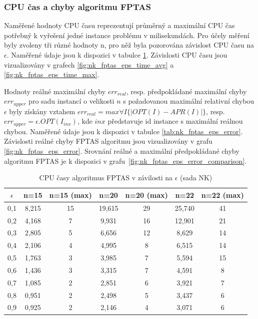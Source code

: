 \documentclass[12pt]{article}
\begin{document}
\subsubsection{CPU čas a chyby algoritmu FPTAS}

Naměřené hodnoty CPU času reprezentují průměrný a maximální CPU čas potřebný k vyřešení jedné instance problému v milisekundách. Pro účely měření byly zvoleny tři různé hodnoty n, pro něž byla pozorována závislost CPU času na $\epsilon$. Naměřené údaje jsou k dispozici v tabulce \ref{tab:nk_fptas_eps_times}. Závislosti CPU času jsou vizualizovány v grafech \ref{fig:nk_fptas_eps_time_avg} a \ref{fig:nk_fptas_eps_time_max}.

Hodnoty reálné maximální chyby $err_{real}$, resp. předpokládané maximální chyby $err_{upper}$ pro sadu instancí o velikosti $n$ s požadovanou maximální relativní chybou $\epsilon$ byly získány vztahem $err_{real} = max \forall I \{|OPT(I) - APR(I)|\}$, resp. $err_{upper} = \epsilon.OPT(I_{inx})$, kde $inx$ představuje id instance s maximální reálnou chybou.
Naměřené údaje jsou k dispozici v tabulce \ref{tab:nk_fptas_eps_error}. Závislosti reálné chyby FPTAS algoritmu jsou vizualizovány v grafu \ref{fig:nk_fptas_eps_error}. Srovnání reálné a maximální předpokládané chyby algoritmu FPTAS je k dispozici v grafu~\ref{fig:nk_fptas_eps_error_comparison}.

\begin{table}
    \begin{center}
         \begin{tabular}{|c | c | c | c | c | c | c|} 
         \hline
         $\epsilon$ & n=15 & n=15 (max) & n=20 & n=20 (max) & n=22 & n=22 (max) \\ [0.1ex] 
         \hline\hline
        0,1 & 8,215 & 15 & 19,615 & 29 & 25,740 & 41 \\
        \hline
        0,2 & 4,168 & 7 & 9,931 & 16 & 12,901 & 21 \\
        \hline
        0,3 & 2,805 & 5 & 6,656 & 12 & 8,629 & 14 \\
        \hline
        0,4 & 2,106 & 4 & 4,995 & 8 & 6,515 & 14 \\
        \hline
        0,5 & 1,763 & 3 & 3,985 & 7 & 5,594 & 15 \\
        \hline
        0,6 & 1,436 & 3 & 3,315 & 7 & 4,591 & 8 \\
        \hline
        0,7 & 1,085 & 2 & 2,851 & 6 & 3,921 & 7 \\
        \hline
        0,8 & 0,951 & 2 & 2,498 & 5 & 3,437 & 6 \\
        \hline
        0,9 & 0,925 & 2 & 2,146 & 4 & 3,071 & 6 \\
        \hline
        \end{tabular}
        \caption{CPU časy algoritmus FPTAS v závilosti na $\epsilon$ (sada NK)} \label{tab:nk_fptas_eps_times}
    \end{center}
\end{table}
\end{document}
